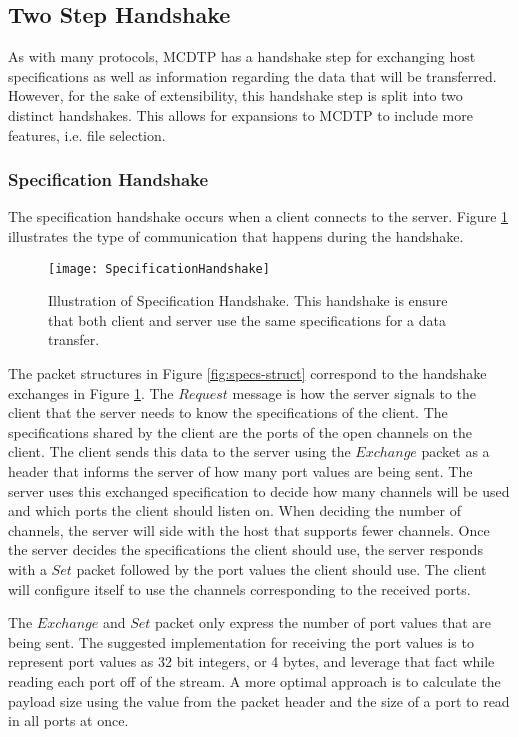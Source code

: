 \subsection{Two Step Handshake}

As with many protocols, MCDTP has a handshake step for exchanging host specifications as well as information regarding the data that will be transferred. However, for the sake of extensibility, this handshake step is split into two distinct handshakes. This allows for expansions to MCDTP to include more features, i.e. file selection.

\subsubsection{Specification Handshake}

The specification handshake occurs when a client connects to the server. Figure \ref{fig:specs} illustrates the type of communication that happens during the handshake.

\begin{figure}[ht]
\centering
\texttt{[image: SpecificationHandshake]}
\caption{Illustration of Specification Handshake. This handshake is ensure that both client and server use the same specifications for a data transfer.}
\label{fig:specs}
\end{figure}

The packet structures in Figure \ref{fig:specs-struct} correspond to the handshake exchanges in Figure \ref{fig:specs}. The $Request$ message is how the server signals to the client that the server needs to know the specifications of the client. The specifications shared by the client are the ports of the open channels on the client. The client sends this data to the server using the $Exchange$ packet as a header that informs the server of how many port values are being sent. The server uses this exchanged specification to decide how many channels will be used and which ports the client should listen on. When deciding the number of channels, the server will side with the host that supports fewer channels. Once the server decides the specifications the client should use, the server responds with a $Set$ packet followed by the port values the client should use. The client will configure itself to use the channels corresponding to the received ports.

The $Exchange$ and $Set$ packet only express the number of port values that are being sent. The suggested implementation for receiving the port values is to represent port values as 32 bit integers, or 4 bytes, and leverage that fact while reading each port off of the stream. A more optimal approach is to calculate the payload size using the value from the packet header and the size of a port to read in all ports at once.

